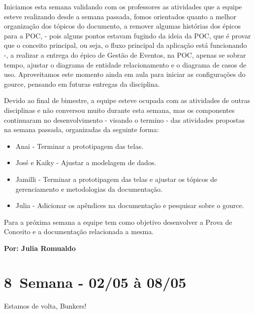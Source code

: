 Iniciamos esta semana validando com os professores as atividades que a equipe esteve realizando desde a semana passada, fomos orientados quanto a melhor organização dos tópicos do documento, a remover algumas histórias dos épicos para a \acs{POC}, - pois alguns pontos estavam fugindo da ideia da \acs{POC}, que é provar que o conceito principal, ou seja, o fluxo principal da aplicação está funcionando -, a realizar a entrega do épico de Gestão de Eventos, na \acs{POC}, apenas se sobrar tempo, ajustar o diagrama de entidade relacionamento e o diagrama de casos de uso. Aproveitamos este momento ainda em aula para iniciar as configurações do \gls{gource}, pensando em futuras entregas da disciplina.

Devido ao final de bimestre, a equipe esteve ocupada com as atividades de outras disciplinas e não conversou muito durante esta semana, mas os componentes continuaram no desenvolvimento - visando o termino - das atividades propostas na semana passada, organizadas da seguinte forma:
\begin{itemize}
    \item Anai - Terminar a prototipagem das telas.
    \item José e Kaiky - Ajustar a modelagem de dados.
    \item Jamilli - Terminar a prototipagem das telas e ajustar os tópicos de gerenciamento e metodologias da documentação. 
    \item Julia - Adicionar os apêndices na documentação e pesquisar sobre o \gls{gource}.
\end{itemize}
\noindent Para a próxima semana a equipe tem como objetivo desenvolver a Prova de Conceito e a documentação relacionada a mesma.

\textbf{Por: Julia Romualdo}

\section{8\textordfeminine \, Semana - 02/05 à 08/05}
Estamos de volta, Bunkers!

